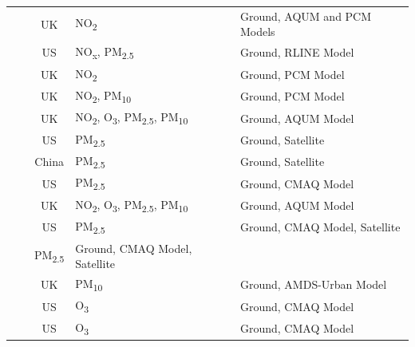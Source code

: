 \begin{landscape}
\begin{longtable}{c p{4cm} c p{4cm} p{6cm}}
  & \cite{Forlani2020AR-INLAd} & UK & NO\textsubscript{2} & Ground, AQUM and PCM Models \\
 
  & \cite{Gilani2019NonstationaryEnvironmentb} & US & NO\textsubscript{x}, PM\textsubscript{2.5} & Ground, RLINE Model  \\
  
  & \cite{Huang2015AnScotlandb} & UK & NO\textsubscript{2} & Ground, PCM Model  \\
  
 & \cite{Huang2018MultivariateUncertaintyb} & UK & NO\textsubscript{2}, PM\textsubscript{10} & Ground, PCM Model  \\ 
 
 & \cite{Lee2017AHealthb} & UK & NO\textsubscript{2}, O\textsubscript{3}, PM\textsubscript{2.5}, PM\textsubscript{10} & Ground, AQUM Model  \\
 
  & \cite{Liang2013Time-spaceDatasets} & US & PM\textsubscript{2.5} & Ground, Satellite  \\
  
 & \cite{Lv2017DailyObservations} & China & PM\textsubscript{2.5} & Ground, Satellite  \\
 
  & \cite{McMillan2010CombiningModelingd} & US & PM\textsubscript{2.5} & Ground, CMAQ Model  \\
  
  & \cite{Mukhopadhyay2018AWalesb} & UK & NO\textsubscript{2}, O\textsubscript{3}, PM\textsubscript{2.5}, PM\textsubscript{10} & Ground, AQUM Model  \\
  
 & \cite{Murray2019ASimulationb} & US & PM\textsubscript{2.5} & Ground, CMAQ Model, Satellite  \\
 
  & \cite{Paciorek2012AssessmentStates.} & PM\textsubscript{2.5} & Ground, CMAQ Model, Satellite  \\
  
  & \cite{Pirani2014BayesianAreas} & UK & PM\textsubscript{10} & Ground, AMDS-Urban Model  \\
  
   & \cite{Sahu2009ImprovedUSb} & US & O\textsubscript{3} & Ground, CMAQ Model  \\
   
 & \cite{Sahu2012HierarchicalData} & US & O\textsubscript{3} & Ground, CMAQ Model  \\
  

\end{longtable}
\end{landscape}

